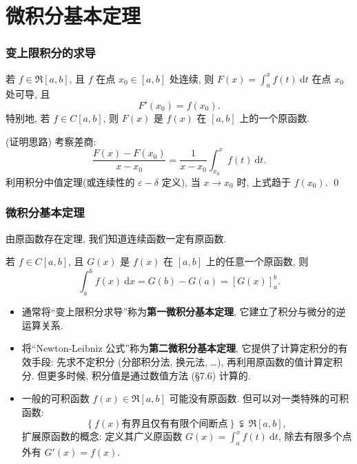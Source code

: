 
\section{微积分基本定理}


\begin{frame}
\frametitle{变上限积分的求导}

\begin{thm}[原函数存在定理]
若 $f \in \mathfrak{R}[a, b]$, 且 $f$ 在点 $x_0 \in [a, b]$ 处连续, 则 $F(x) = \int_a^x f(t) ~ \mathrm{d}t$ 在点 $x_0$ 处可导, 且
\[ F'(x_0) = f(x_0). \]
特别地, 若 $f \in C[a, b]$, 则 $F(x)$ 是 $f(x)$ 在 $[a, b]$ 上的一个原函数.
\end{thm}

\pause

\startproof[bg=yellow, fg=red](证明思路)
考察差商:
\[ \frac{F(x) - F(x_0)}{x - x_0} = \frac{1}{x - x_0} \int_{x_0}^x f(t) ~ \mathrm{d}t. \]
利用积分中值定理(或连续性的 $\varepsilon-\delta$ 定义), 当 $x \to x_0$ 时, 上式趋于 $f(x_0)$.
\qed

\end{frame}


\begin{frame}
\frametitle{微积分基本定理}

由原函数存在定理, 我们知道连续函数一定有原函数.

\begin{thm}
若 $f \in C[a, b]$, 且 $G(x)$ 是 $f(x)$ 在 $[a, b]$ 上的\alert{任意}一个原函数, 则
\[ \int_a^b f(x) ~ \mathrm{d}x = G(b) - G(a) = \left[ G(x) \right]_a^b. \]
\end{thm}

\pause

\begin{remark}
\begin{itemize}
\item 通常将``变上限积分求导''称为\textbf{第一微积分基本定理}, 它建立了积分与微分的逆运算关系.
\pause
\item 将``Newton-Leibniz 公式''称为\textbf{第二微积分基本定理}, 它提供了计算定积分的有效手段: 先求不定积分 (\alert{分部积分法, 换元法, \dots}), 再利用原函数的值计算定积分.
\pause
但更多时候, 积分值是通过数值方法 (\S 7.6) 计算的.
\pause
\item 一般的可积函数 $f(x) \in \mathfrak{R}[a, b]$ 可能没有原函数. 但可以对一类特殊的可积函数:
\[
\{ ~ f(x) \text{有界且仅有有限个间断点} ~ \} ~ \subsetneqq ~ \mathfrak{R}[a, b],
\]
扩展原函数的概念: 定义其广义原函数 $G(x) = \int_a^x f(t) ~ \mathrm{d}t$, 除去有限多个点外有 $G'(x) = f(x).$
\end{itemize}
\end{remark}

\end{frame}

